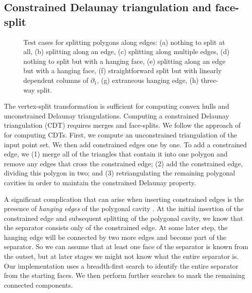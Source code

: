 \documentclass[twocolumn]{article}
\begin{document}
\subsection{Constrained Delaunay triangulation and face-split}

\begin{figure}[t]
    \begin{center}
        
    \end{center}
    \caption{Test cases for splitting polygons along edges: (a) nothing to split at all, (b) splitting along an edge, (c) splitting along multiple edges, (d) nothing to split but with a hanging face, (e) splitting along an edge but with a hanging face, (f) straightforward split but with linearly dependent columns of $\partial_1$, (g) extraneous hanging edge, (h) three-way split.}
    \label{fig:face-split-tests}
\end{figure}

The vertex-split transformation is sufficient for computing convex hulls and unconstrained Delaunay triangulations.
Computing a constrained Delaunay triangulation (CDT) requires merges and face-splits.
We follow the approach of \cite{anglada1997improved} for computing CDTs.
First, we compute an unconstrained triangulation of the input point set.
We then add constrained edges one by one.
To add a constrained edge, we (1) merge all of the triangles that contain it into one polygon and remove any edges that cross the constrained edge; (2) add the constrained edge, dividing this polygon in two; and (3) retriangulating the remaining polygonal cavities in order to maintain the constrained Delaunay property.

A significant complication that can arise when inserting constrained edges is the presence of \emph{hanging edges} of the polygonal cavity \cite{cheng2013delaunay}.
At the initial insertion of the constrained edge and subsequent splitting of the polygonal cavity, we know that the separator consists only of the constrained edge.
At some later step, the hanging edge will be connected by two more edges and become part of the separator.
So we can assume that at least one face of the separator is known from the outset, but at later stages we might not know what the entire separator is.
Our implementation uses a breadth-first search to identify the entire separator from the starting faces.
We then perform further searches to mark the remaining connected components.
\end{document}
